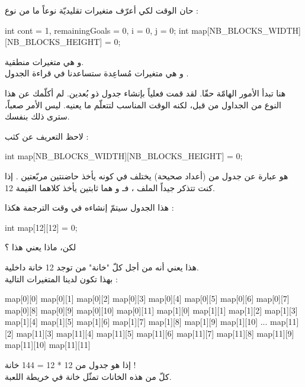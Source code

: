 حان الوقت لكي أعرّف متغيرات تقليديّة نوعاً ما من نوع 
 :

\begin{Csource}
int cont = 1, remainingGoals = 0, i = 0, j = 0;
int map[NB_BLOCKS_WIDTH][NB_BLOCKS_HEIGHT] = {0};
\end{Csource}

و 
هي متغيرات منطقية.\\
و
هي متغيرات مُساعِدة ستساعدنا في قراءة الجدول 
.

هنا تبدأ الأمور الهامّة حقّا. لقد قمت فعلياً بإنشاء جدول ذو بُعدين. لم أكلّمك عن هذا النوع من الجداول من قبل، لكنه الوقت المناسب لتتعلّم ما يعنيه. ليس الأمر صعباً، سترى ذلك بنفسك.

لاحظ التعريف عن كثب :

\begin{Csource}
int map[NB_BLOCKS_WIDTH][NB_BLOCKS_HEIGHT] = {0};
\end{Csource}

هو عبارة عن جدول من 
(أعداد صحيحة) يختلف في كونه يأخذ حاضنتين مربّعتين
\InlineCode{[ ]}.
إذا كنت تتذكر جيداً الملف 
،
 فـ
و
هما ثابتين يأخذ كلاهما القيمة 12.

هذا الجدول سيتمّ إنشاءه في وقت الترجمة هكذا :

\begin{Csource}
int map[12][12] = {0};
\end{Csource}

\begin{question}
لكن، ماذا يعني هذا ؟
\end{question}

هذا يعني أنه من أجل كلّ "خانة" من
توجد 12 خانة داخلية.\\
بهذا تكون لدينا المتغيرات التالية :

\begin{Csource}
map[0][0]
map[0][1]
map[0][2]
map[0][3]
map[0][4]
map[0][5]
map[0][6]
map[0][7]
map[0][8]
map[0][9]
map[0][10]
map[0][11]
map[1][0]
map[1][1]
map[1][2]
map[1][3]
map[1][4]
map[1][5]
map[1][6]
map[1][7]
map[1][8]
map[1][9]
map[1][10]
...
map[11][2]
map[11][3]
map[11][4]
map[11][5]
map[11][6]
map[11][7]
map[11][8]
map[11][9]
map[11][10]
map[11][11]
\end{Csource}

إذا هو جدول من 12 * 12 = 144 خانة !\\
كلّ من هذه الخانات تمثّل خانة في خريطة اللعبة.

